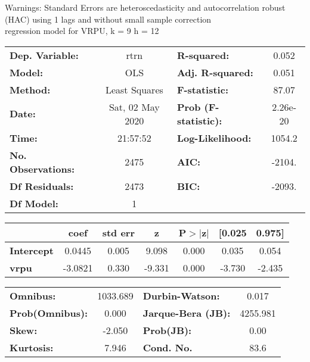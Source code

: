 Warnings: \newline
 [1] Standard Errors are heteroscedasticity and autocorrelation robust (HAC) using 1 lags and without small sample correction\\ 

regression model for VRPU, k = 9 h = 12\begin{center}
\begin{tabular}{lclc}
\toprule
\textbf{Dep. Variable:}    &       rtrn       & \textbf{  R-squared:         } &     0.052   \\
\textbf{Model:}            &       OLS        & \textbf{  Adj. R-squared:    } &     0.051   \\
\textbf{Method:}           &  Least Squares   & \textbf{  F-statistic:       } &     87.07   \\
\textbf{Date:}             & Sat, 02 May 2020 & \textbf{  Prob (F-statistic):} &  2.26e-20   \\
\textbf{Time:}             &     21:57:52     & \textbf{  Log-Likelihood:    } &    1054.2   \\
\textbf{No. Observations:} &        2475      & \textbf{  AIC:               } &    -2104.   \\
\textbf{Df Residuals:}     &        2473      & \textbf{  BIC:               } &    -2093.   \\
\textbf{Df Model:}         &           1      & \textbf{                     } &             \\
\bottomrule
\end{tabular}
\begin{tabular}{lcccccc}
                   & \textbf{coef} & \textbf{std err} & \textbf{z} & \textbf{P$> |$z$|$} & \textbf{[0.025} & \textbf{0.975]}  \\
\midrule
\textbf{Intercept} &       0.0445  &        0.005     &     9.098  &         0.000        &        0.035    &        0.054     \\
\textbf{vrpu}      &      -3.0821  &        0.330     &    -9.331  &         0.000        &       -3.730    &       -2.435     \\
\bottomrule
\end{tabular}
\begin{tabular}{lclc}
\textbf{Omnibus:}       & 1033.689 & \textbf{  Durbin-Watson:     } &    0.017  \\
\textbf{Prob(Omnibus):} &   0.000  & \textbf{  Jarque-Bera (JB):  } & 4255.981  \\
\textbf{Skew:}          &  -2.050  & \textbf{  Prob(JB):          } &     0.00  \\
\textbf{Kurtosis:}      &   7.946  & \textbf{  Cond. No.          } &     83.6  \\
\bottomrule
\end{tabular}
\end{center}

